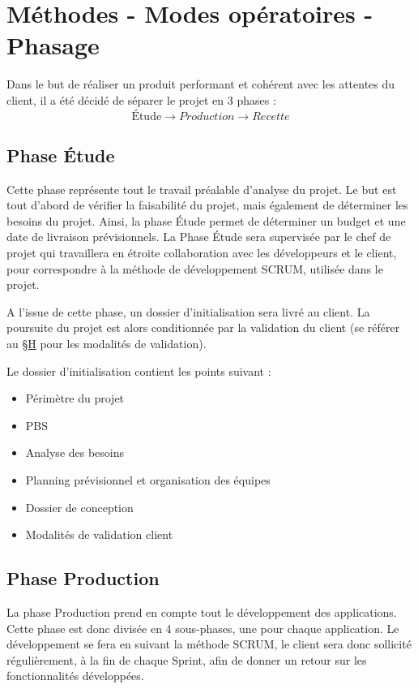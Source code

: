 \documentclass[a4paper]{article}
\begin{document}
	    
	    
	    
	    
	\section{Méthodes - Modes opératoires - Phasage}
Dans le but de réaliser un produit performant et cohérent avec les attentes du client, il a été décidé de séparer le projet en 3 phases : 
$$\text{\'Etude} \rightarrow Production \rightarrow Recette$$
    
        \subsection*{Phase \'Etude}

Cette phase représente tout le travail préalable d'analyse du projet. Le but est tout d'abord de vérifier la faisabilité du projet, mais également de déterminer les besoins du projet. Ainsi, la phase \'Etude permet de déterminer un budget et une date de livraison prévisionnels. La Phase \'Etude sera supervisée par le chef de projet qui travaillera en étroite collaboration avec les développeurs et le client, pour correspondre à la méthode de développement SCRUM, utilisée dans le projet.

A l'issue de cette phase, un dossier d'initialisation sera livré au client. La poursuite du projet est alors conditionnée par la validation du client (se référer au \hyperlink{H}{\S H} pour les modalités de validation).

Le dossier d'initialisation contient les points suivant :
\begin{itemize}
    \item Périmètre du projet
    \item PBS
    \item Analyse des besoins 
    \item Planning prévisionnel et organisation des équipes
    \item Dossier de conception 
    \item Modalités de validation client
\end{itemize}

	    \subsection*{Phase Production}

La phase Production prend en compte tout le développement des applications. Cette phase est donc divisée en 4 sous-phases, une pour chaque application. Le développement se fera en suivant la méthode SCRUM, le client sera donc sollicité régulièrement, à la fin de chaque Sprint, afin de donner un retour sur les fonctionnalités développées. 
\end{document}

